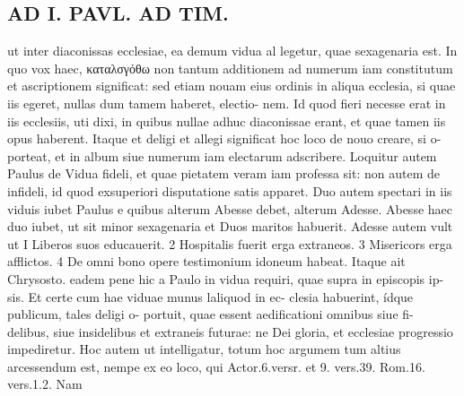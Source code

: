 \documentclass{article}
\begin{document}
\begin{pages}
\section*{AD I. PAVL. AD TIM. }
\marginpar{[ p.270 ]}ut inter diaconissas ecclesiae, ea demum vidua al legetur, quae sexagenaria est. In quo vox haec, καταλσγόθω non tantum additionem ad numerum iam constitutum et ascriptionem significat: sed etiam nouam eius ordinis in aliqua ecclesia, si quae iis egeret, nullas dum tamem haberet, electio- nem. Id quod fieri necesse erat in iis ecclesiis, uti dixi, in quibus nullae adhuc diaconissae erant, et quae tamen iis opus haberent. Itaque et deligi et allegi significat hoc loco de nouo creare, si o- porteat, et in album siue numerum iam electarum adscribere. Loquitur autem Paulus de Vidua fideli, et quae pietatem veram iam professa sit: non autem de infideli, id quod exsuperiori disputatione satis apparet. Duo autem spectari in iis viduis iubet Paulus e quibus alterum Abesse debet, alterum Adesse. Abesse haec duo iubet, ut sit minor sexagenaria et Duos maritos habuerit. Adesse autem vult ut I Liberos suos educauerit. 2 Hospitalis fuerit erga extraneos. 3 Misericors erga afflictos. 4 De omni bono opere testimonium idoneum habeat. Itaque ait Chrysosto. eadem pene hic a Paulo in vidua requiri, quae supra in episcopis ip- sis. Et certe cum hae viduae munus laliquod in ec- clesia habuerint, ídque publicum, tales deligi o- portuit, quae essent aedificationi omnibus siue fi- delibus, siue insidelibus et extraneis futurae: ne Dei gloria, et ecclesiae progressio impediretur. Hoc autem ut intelligatur, totum hoc argumem tum altius arcessendum est, nempe ex eo loco, qui Actor.6.versr. et 9. vers.39. Rom.16. vers.1.2. Nam 

\end{pages}
\end{document}
